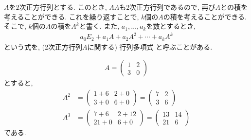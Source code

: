 $A$を$2$次正方行列とする.
このとき, $AA$も$2$次正方行列であるので,
再び$A$との積を考えることができる.
これを繰り返すことで, $k$個の$A$の積を考えることができる.
そこで, 
$k$個の$A$の積を$A^k$と書く.
また, $a_1,\ldots,a_k$を数とするとき,
\begin{align*}
  a_0E_2+a_1A+a_2A^2+\cdots+a_kA^k
\end{align*}
という式を, ($2$次正方行列$A$に関する) 行列多項式
と呼ぶことがある.

\begin{example}
  \begin{align*}
    A=\begin{pmatrix}1&2\\3&0\end{pmatrix}
  \end{align*}
  とすると,
  \begin{align*}
    A^2&=\begin{pmatrix}1+6&2+0\\3+0&6+0\end{pmatrix}
    =\begin{pmatrix}7&2\\3&6\end{pmatrix}\\
    A^3&=\begin{pmatrix}7+6&2+12\\21+0&6+0\end{pmatrix}
    =\begin{pmatrix}13&14\\21&6\end{pmatrix}
  \end{align*}
  である.
\end{example}

